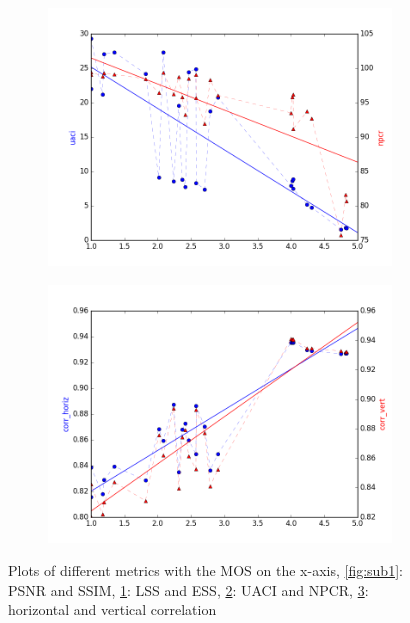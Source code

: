 \documentclass{article}
\begin{document}
\begin{figure}[ht]
\begin{subfigure}{4.3cm}
  \caption{}
  \label{fig:sub2}
\end{subfigure}
\begin{subfigure}{4.3cm}
  \centering
  \includegraphics[width=1\linewidth]{figures/mos_npcr}
  \caption{}
  \label{fig:sub3}
\end{subfigure}%
\begin{subfigure}{4.3cm}
  \centering
  \includegraphics[width=1\linewidth]{figures/mos_corr_vert}
  \caption{}
  \label{fig:sub5}
\end{subfigure}%

\caption{Plots of different metrics with the MOS on the x-axis, \ref{fig:sub1}: PSNR and SSIM, \ref{fig:sub2}: LSS and ESS, \ref{fig:sub3}: UACI and NPCR, \ref{fig:sub5}: horizontal and vertical correlation}
\label{fig:plots}
\end{figure}
\end{document}
